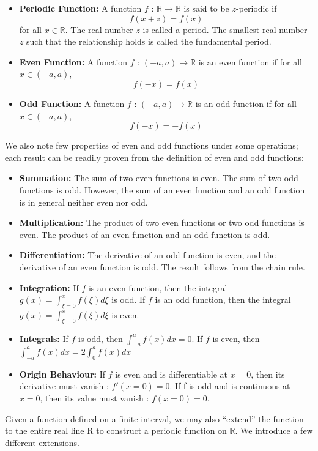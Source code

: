 \documentclass[11pt]{article}
\newcommand{\R}{\mathbb{R}}
\begin{document}
\begin{itemize}
\item \textbf{Periodic Function: }A function $f$ : $\R \rightarrow \R$ is said to be $z$-periodic if $$f(x+z)=f(x)$$ for all $ x \in \R$. The real number $z$ is called a period. The smallest real number $z$ such that the relationship holds is called the fundamental period.
\item \textbf{Even Function:} A function $f$ : $(-a, a) \rightarrow \R$ is an even function if for all $x \in (-a, a)$,$$f(-x) = f(x)$$
\item \textbf{Odd Function:} A function $f$ : $(-a, a) \rightarrow \R$ is an odd function if for all $x \in (-a, a)$, $$f(-x) = -f(x)$$
\end{itemize}
We also note few properties of even and odd functions under some operations; each result can be readily proven from the definition of even and odd functions:
\begin{itemize}
\item \textbf{Summation:} The sum of two even functions is even. The sum of two odd functions is odd. However, the sum of an even function and an odd function is in general neither even nor odd.
\item \textbf{Multiplication:} The product of two even functions or two odd functions is even. The product of an even function and an odd function is odd.
\item \textbf{Differentiation: }The derivative of an odd function is even, and the derivative of an even function is odd. The result follows from the chain rule.
\item \textbf{Integration: }If $f$ is an even function, then the integral $g(x) = \int_{\xi=0}^{x} f(\xi)d \xi$ is odd.  If $f$ is an odd function, then the integral $g(x) = \int_{\xi=0}^x f(\xi) d\xi$ is even. 
\item \textbf{Integrals: }If $f$ is odd,  then $\int_{-a}^{a} f(x)dx = 0.$ If $f$ is even, then $\int_{-a}^{a} f(x)dx = 2 \int_{0}^{a} f(x)dx$
\item \textbf{Origin Behaviour:}  If $f$ is even and is differentiable at $x = 0$, then its derivative must vanish : $f'(x = 0) = 0$.  If f is odd and is continuous at $x = 0$, then its value must vanish : $f(x = 0) = 0$.
\end{itemize}
Given a function defined on a finite interval, we may also “extend” the function to the entire real line R to construct a periodic function on $\R$. We introduce a few different extensions.
\end{document}
